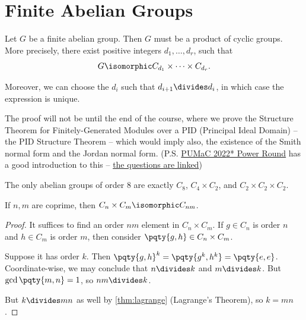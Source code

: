 \section{Finite Abelian Groups}

\begin{theorem}
    \label{thm:classification-finite-abelian-group}%
    Let \(G\) be a finite abelian group. Then \(G\) must be a product of cyclic groups. More precisely, there exist positive integers \(d_1, \ldots, d_r\), such that
    \[
        G \isomorphic C_{d_1} \times \cdots \times C_{d_r}.
    \]

    Moreover, we can choose the \(d_i\) such that \(d_{i + 1} \divides d_i\), in which case the expression is unique.
\end{theorem}

The proof will not be until the end of the course, where we prove the Structure Theorem for Finitely-Generated Modules over a PID (Principal Ideal Domain) -- the PID Structure Theorem -- which would imply also, the existence of the Smith normal form and the Jordan normal form. (P.S. \href{https://pumac.princeton.edu/archives#2022}{PUMaC 2022* Power Round} has a good introduction to this -- \href{https://static1.squarespace.com/static/570450471d07c094a39efaed/t/642304302502a43377dedfed/1680016432869/PUMaC2023PowerRoundMarch28Update.pdf}{the questions are linked})

\begin{example}
    The only abelian groups of order \(8\) are exactly \(C_8\), \(C_4 \times C_2\), and \(C_2 \times C_2 \times C_2\).
\end{example}

\begin{lemma}
    \label{lem:chinese-remainder-theorem}
    If \(n, m\) are coprime, then \(C_n \times C_m \isomorphic C_{nm}\).
\end{lemma}

\begin{proof}
    It suffices to find an order \(nm\) element in \(C_n \times C_m\). If \(g \in C_n\) is order \(n\) and \(h \in C_m\) is order \(m\), then consider \(\pqty{g, h} \in C_n \times C_m\).

    Suppose it has order \(k\). Then \(\pqty{g, h}^k = \pqty{g^k, h^k} = \pqty{e, e}\). Coordinate-wise, we may conclude that \(n \divides k\) and \(m \divides k\). But \(\gcd\pqty{m, n} = 1\), so \(nm \divides k\).
    
    But \(k \divides mn\) as well by \autoref{thm:lagrange} (Lagrange's Theorem), so \(k = mn\).
\end{proof}

